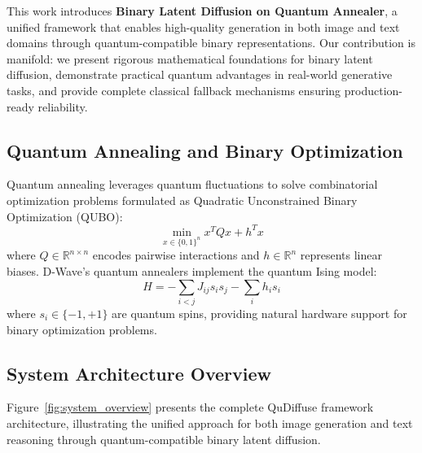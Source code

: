 \documentclass{article}
\begin{document}
This work introduces \textbf{Binary Latent Diffusion on Quantum Annealer}, a unified framework that enables high-quality generation in both image and text domains through quantum-compatible binary representations. Our contribution is manifold: we present rigorous mathematical foundations for binary latent diffusion, demonstrate practical quantum advantages in real-world generative tasks, and provide complete classical fallback mechanisms ensuring production-ready reliability.

\subsection{Quantum Annealing and Binary Optimization}

Quantum annealing leverages quantum fluctuations to solve combinatorial optimization problems formulated as Quadratic Unconstrained Binary Optimization (QUBO):
\begin{equation}
\min_{x \in \{0,1\}^n} x^T Q x + h^T x
\end{equation}
where $Q \in \mathbb{R}^{n \times n}$ encodes pairwise interactions and $h \in \mathbb{R}^n$ represents linear biases. D-Wave's quantum annealers implement the quantum Ising model:
\begin{equation}
H = -\sum_{i<j} J_{ij} s_i s_j - \sum_i h_i s_i
\end{equation}
where $s_i \in \{-1, +1\}$ are quantum spins, providing natural hardware support for binary optimization problems.

\subsection{System Architecture Overview}

Figure~\ref{fig:system_overview} presents the complete QuDiffuse framework architecture, illustrating the unified approach for both image generation and text reasoning through quantum-compatible binary latent diffusion.
\end{document}
